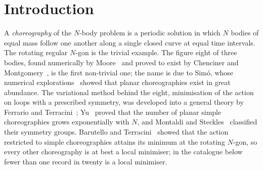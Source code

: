 \documentclass[11pt]{amsart}
\theoremstyle{definition}
\begin{document}
\section{Introduction}

A \emph{choreography} of the $N$-body problem is a periodic solution in which $N$ bodies of equal mass follow one another along a single closed curve at equal time intervals. The rotating regular $N$-gon is the trivial example. The figure eight of three bodies, found numerically by Moore~\cite{Moore1993} and proved to exist by Chenciner and Montgomery~\cite{ChencinerMontgomery2000}, is the first non-trivial one; the name is due to Sim\'o, whose numerical explorations~\cite{Simo2001,Simo2002,CGMS2002} showed that planar choreographies exist in great abundance. The variational method behind the eight, minimisation of the action on loops with a prescribed symmetry, was developed into a general theory by Ferrario and Terracini~\cite{FerrarioTerracini2004}; Yu~\cite{Yu2017} proved that the number of planar simple choreographies grows exponentially with $N$, and Montaldi and Steckles~\cite{MontaldiSteckles2013} classified their symmetry groups. Barutello and Terracini~\cite{BarutelloTerracini2004} showed that the action restricted to simple choreographies attains its minimum at the rotating $N$-gon, so every other choreography is at best a local minimiser; in the catalogue below fewer than one record in twenty is a local minimiser.
\end{document}
